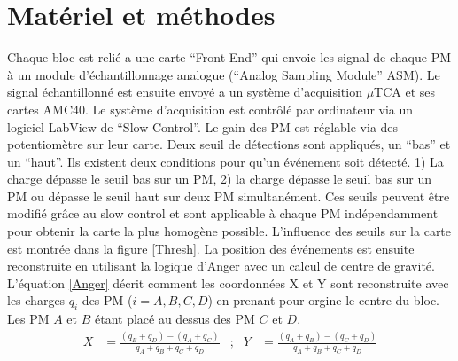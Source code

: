 \documentclass[11pt,a4paper,oldfontcommands]{memoir}
\begin{document}
\section{Matériel et méthodes}

Chaque bloc est relié a une carte \enquote{Front End} qui envoie les signal de chaque PM à un module d’échantillonnage analogue (\enquote{Analog Sampling Module} ASM). Le signal échantillonné est ensuite envoyé a un système d’acquisition $\mu$TCA et ses cartes AMC40. Le système d'acquisition est contrôlé par ordinateur via un logiciel LabView de \enquote{Slow Control}. Le gain des PM est réglable via des potentiomètre sur leur carte. Deux seuil de détections sont appliqués, un \enquote{bas} et un \enquote{haut}. Ils existent deux conditions pour qu'un événement soit détecté. 1) La charge dépasse le seuil bas sur un PM, 2) la charge dépasse le seuil bas sur un PM ou dépasse le seuil haut sur deux PM simultanément. Ces seuils peuvent être modifié grâce au slow control et sont applicable à chaque PM indépendamment pour obtenir la carte la plus homogène possible. L'influence des seuils sur la carte est montrée dans la figure \ref{Thresh}. La position des événements est ensuite reconstruite en utilisant la logique d'Anger avec un calcul de centre de gravité. L'équation \ref{Anger} décrit comment les coordonnées X et Y sont reconstruite avec les charges $q_i$ des PM ($i = A,B,C,D$) en prenant pour orgine le centre du bloc. Les PM $A$ et $B$ étant placé au dessus des PM $C$ et $D$. 
\begin{equation}
\begin{array}{lllll}

X &= \frac{(q_B+q_D)-(q_A+q_C)}{q_A+q_B+q_C+q_D} &; &Y &= \frac{(q_A+q_B)-(q_C+q_D)}{q_A+q_B+q_C+q_D}

\label{Anger}
\end{array}
\end{equation}
\end{document}
